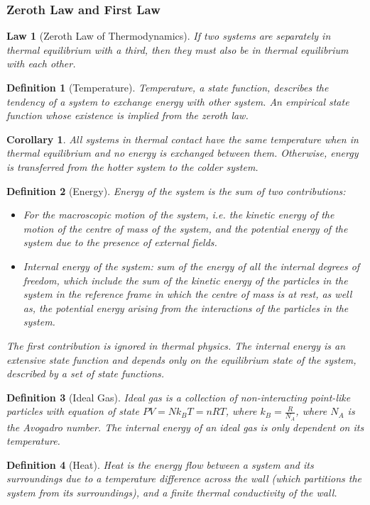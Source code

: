 \documentclass[a4paper]{article}
\newtheorem{defi}{Definition}[section]
\newtheorem{law}{Law}[section]
\newtheorem{cor}{Corollary}[section]
\theoremstyle{new}
\begin{document}
\subsubsection*{Zeroth Law and First Law}
\begin{law}[Zeroth Law of Thermodynamics]
If two systems are separately in thermal equilibrium with a third, then they must also be in thermal equilibrium with each other.
\end{law}
\begin{defi}[Temperature]
Temperature, a state function, describes the tendency of a system to exchange energy with other system. An empirical state function whose existence is implied from the zeroth law.
\end{defi}
\begin{cor}
All systems in thermal contact have the same temperature when in thermal equilibrium and no energy is exchanged between them. Otherwise, energy is transferred from the hotter system to the colder system.
\end{cor}
\begin{defi}[Energy]
Energy of the system is the sum of two contributions:
\begin{itemize}
    \item For the macroscopic motion of the system, i.e. the kinetic energy of the motion of the centre of mass of the system, and the potential energy of the system due to the presence of external fields. 
    \item Internal energy of the system: sum of the energy of all the internal degrees of freedom, which include the sum of the kinetic energy of the particles in the system in the reference frame in which the centre of mass is at rest, as well as, the potential energy arising from the interactions of the particles in the system.
\end{itemize}
The first contribution is ignored in thermal physics. The internal energy is an extensive state function and depends only on the equilibrium state of the system, described by a set of state functions.
\end{defi}
\begin{defi}[Ideal Gas]
Ideal gas is a collection of non-interacting point-like particles with equation of state $PV=Nk_BT=nRT$, where $k_B=\frac{R}{N_A}$, where $N_A$ is the Avogadro number. The internal energy of an ideal gas is only dependent on its temperature.
\end{defi}
\begin{defi}[Heat]
Heat is the energy flow between a system and its surroundings due to a temperature difference across the wall (which partitions the system from its surroundings), and a finite thermal conductivity of the wall.
\end{defi}
\end{document}
